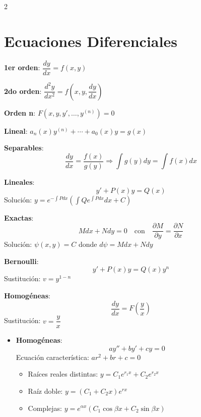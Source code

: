 \documentclass{article}
\begin{document}
        
 \begin{multicols}{2}
      \section{Ecuaciones Diferenciales}

      \begin{itemform}
      \item \textbf{1er orden}: $\dfrac{dy}{dx} = f(x,y)$
      \item \textbf{2do orden}: $\dfrac{d^2y}{dx^2} = f\left(x,y,\dfrac{dy}{dx}\right)$
      \item \textbf{Orden n}: $F\left(x,y,y',\dots,y^{(n)}\right) = 0$
      \item \textbf{Lineal}: $a_n(x)y^{(n)} + \cdots + a_0(x)y = g(x)$
      \end{itemform}

      \begin{itemform}
      \item \textbf{Separables}:
        $$\dfrac{dy}{dx} = \dfrac{f(x)}{g(y)} \Rightarrow \int g(y)dy = \int f(x)dx$$

      \item \textbf{Lineales}:
        $$y' + P(x)y = Q(x)$$
        Solución: $y = e^{-\int P dx}\left(\int Q e^{\int P dx}dx + C\right)$

      \item \textbf{Exactas}:
        $$Mdx + Ndy = 0 \quad \text{con} \quad \dfrac{\partial M}{\partial y} = \dfrac{\partial N}{\partial x}$$
        Solución: $\psi(x,y) = C$ donde $d\psi = Mdx + Ndy$

      \item \textbf{Bernoulli}:
        $$y' + P(x)y = Q(x)y^n$$
        Sustitución: $v = y^{1-n}$

      \item \textbf{Homogéneas}:
        $$\dfrac{dy}{dx} = F\left(\dfrac{y}{x}\right)$$
        Sustitución: $v = \dfrac{y}{x}$
      \end{itemform}

      \begin{itemize}[leftmargin=*,noitemsep,topsep=0pt]
        \item \textbf{Homogéneas}:
          $$ay'' + by' + cy = 0$$
          Ecuación característica: $ar^2 + br + c = 0$
          \begin{itemize}[leftmargin=*,noitemsep,topsep=0pt]
            \item Raíces reales distintas: $y = C_1e^{r_1x} + C_2e^{r_2x}$
            \item Raíz doble: $y = (C_1 + C_2x)e^{rx}$
            \item Complejas: $y = e^{\alpha x}(C_1\cos\beta x + C_2\sin\beta x)$
          \end{itemize}


\end{itemize}
\end{multicols}
\end{document}
